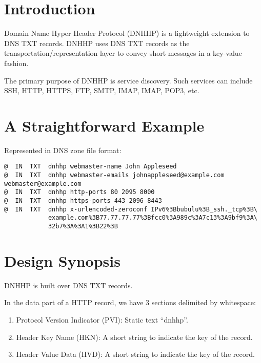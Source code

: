 \documentclass[a4paper,11pt]{article}
\begin{document}

\fulldoctitle


\section*{Introduction}

Domain Name Hyper Header Protocol (DNHHP) is a lightweight extension to DNS TXT records.
DNHHP uses DNS TXT records as the transportation/representation layer to convey short messages in a key-value fashion.

The primary purpose of DNHHP is service discovery.
Such services can include SSH, HTTP, HTTPS, FTP, SMTP, IMAP, IMAP, POP3, etc.

\tableofcontents\clearpage




\section{A Straightforward Example}

Represented in DNS zone file format:

\begin{lstlisting}
@  IN  TXT  dnhhp webmaster-name John Appleseed
@  IN  TXT  dnhhp webmaster-emails johnappleseed@example.com webmaster@example.com
@  IN  TXT  dnhhp http-ports 80 2095 8000
@  IN  TXT  dnhhp https-ports 443 2096 8443
@  IN  TXT  dnhhp x-urlencoded-zeroconf IPv6%3Bbubulu%3B_ssh._tcp%3B\
            example.com%3B77.77.77.77%3Bfcc0%3A989c%3A7c13%3A9bf9%3A\
            32b7%3A%3A1%3B22%3B
\end{lstlisting}







\section{Design Synopsis}

DNHHP is built over DNS TXT records.

In the data part of a HTTP record, we have 3 sections delimited by whitespace:

\begin{enumerate}
	\item Protocol Version Indicator (PVI): Static text ``dnhhp''.
	\item Header Key Name (HKN): A short string to indicate the key of the record.
	\item Header Value Data (HVD): A short string to indicate the key of the record.
\end{enumerate}
\end{document}
